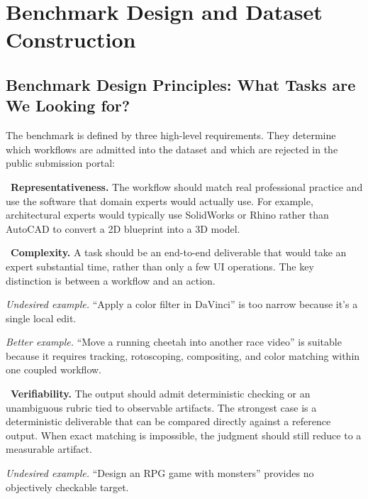 \vspace{-0.6em}
\section{Benchmark Design and Dataset Construction}
\label{sec:dataset}
\vspace{-0.6em}
\subsection{Benchmark Design Principles: What Tasks are We Looking for?}
\label{sec:design-principles}

The benchmark is defined by three high-level requirements. They determine which workflows are
admitted into the dataset and which are rejected in the public submission portal:

\noindent \textbullet\ \textbf{Representativeness.} The workflow should match real professional practice and use the software that domain experts would actually use. 
\noindent For example, architectural experts would typically use \colorbox{green!8}{SolidWorks or Rhino} rather than \colorbox{red!8}{AutoCAD} to convert a 2D blueprint into a 3D model.

\noindent \textbullet\ \textbf{Complexity.} A task should be an end-to-end deliverable that would take an expert substantial time, rather than only a few UI operations. The key distinction is between a workflow and an action.

\noindent \colorbox{red!8}{\parbox{\dimexpr\linewidth-2\fboxsep\relax}{\textit{Undesired example.} ``Apply a color filter in DaVinci'' is too narrow because it's a single local edit.}}

\noindent \colorbox{green!8}{\parbox{\dimexpr\linewidth-2\fboxsep\relax}{\textit{Better example.} ``Move a running cheetah into another race video'' is suitable because it requires tracking, rotoscoping, compositing, and color matching within one coupled workflow.}}

\noindent \textbullet\ \textbf{Verifiability.} The output should admit deterministic checking or an unambiguous rubric tied to observable artifacts. The strongest case is a deterministic deliverable that can be compared directly against a reference output. When exact matching is impossible, the judgment should still reduce to a measurable artifact.

\noindent \colorbox{red!8}{\parbox{\dimexpr\linewidth-2\fboxsep\relax}{\textit{Undesired example.} ``Design an RPG game with monsters'' provides no objectively checkable target.}}


